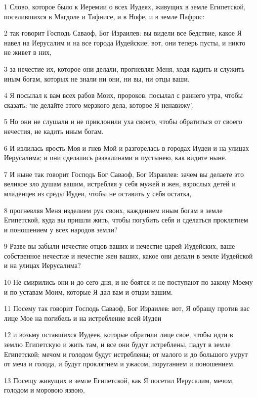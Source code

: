 \par 1 Слово, которое было к Иеремии о всех Иудеях, живущих в земле Египетской, поселившихся в Магдоле и Тафнисе, и в Нофе, и в земле Пафрос:
\par 2 так говорит Господь Саваоф, Бог Израилев: вы видели все бедствие, какое Я навел на Иерусалим и на все города Иудейские; вот, они теперь пусты, и никто не живет в них,
\par 3 за нечестие их, которое они делали, прогневляя Меня, ходя кадить и служить иным богам, которых не знали ни они, ни вы, ни отцы ваши.
\par 4 Я посылал к вам всех рабов Моих, пророков, посылал с раннего утра, чтобы сказать: `не делайте этого мерзкого дела, которое Я ненавижу'.
\par 5 Но они не слушали и не приклонили уха своего, чтобы обратиться от своего нечестия, не кадить иным богам.
\par 6 И излилась ярость Моя и гнев Мой и разгорелась в городах Иудеи и на улицах Иерусалима; и они сделались развалинами и пустынею, как видите ныне.
\par 7 И ныне так говорит Господь Бог Саваоф, Бог Израилев: зачем вы делаете это великое зло душам вашим, истребляя у себя мужей и жен, взрослых детей и младенцев из среды Иудеи, чтобы не оставить у себя остатка,
\par 8 прогневляя Меня изделием рук своих, каждением иным богам в земле Египетской, куда вы пришли жить, чтобы погубить себя и сделаться проклятием и поношением у всех народов земли?
\par 9 Разве вы забыли нечестие отцов ваших и нечестие царей Иудейских, ваше собственное нечестие и нечестие жен ваших, какое они делали в земле Иудейской и на улицах Иерусалима?
\par 10 Не смирились они и до сего дня, и не боятся и не поступают по закону Моему и по уставам Моим, которые Я дал вам и отцам вашим.
\par 11 Посему так говорит Господь Саваоф, Бог Израилев: вот, Я обращу против вас лице Мое на погибель и на истребление всей Иудеи
\par 12 и возьму оставшихся Иудеев, которые обратили лице свое, чтобы идти в землю Египетскую и жить там, и все они будут истреблены, падут в земле Египетской; мечом и голодом будут истреблены; от малого и до большого умрут от меча и голода, и будут проклятием и ужасом, поруганием и поношением.
\par 13 Посещу живущих в земле Египетской, как Я посетил Иерусалим, мечом, голодом и моровою язвою,

